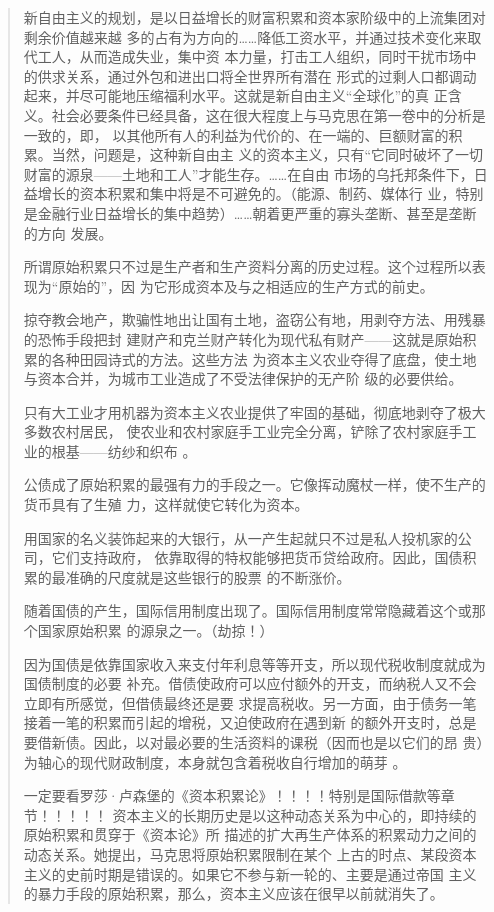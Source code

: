 \begin{quotation}
新自由主义的规划，是以日益增长的财富积累和资本家阶级中的上流集团对剩余价值越来越
多的占有为方向的……降低工资水平，并通过技术变化来取代工人，从而造成失业，集中资
本力量，打击工人组织，同时干扰市场中的供求关系，通过外包和进出口将全世界所有潜在
形式的过剩人口都调动起来，并尽可能地压缩福利水平。这就是新自由主义“全球化”的真
正含义。社会必要条件已经具备，这在很大程度上与马克思在第一卷中的分析是一致的，即，
以其他所有人的利益为代价的、在一端的、巨额财富的积累。当然，问题是，这种新自由主
义的资本主义，只有“它同时破坏了一切财富的源泉——土地和工人”才能生存。……在自由
市场的乌托邦条件下，日益增长的资本积累和集中将是不可避免的。（能源、制药、媒体行
业，特别是金融行业日益增长的集中趋势）……朝着更严重的寡头垄断、甚至是垄断的方向
发展。 




所谓原始积累只不过是生产者和生产资料分离的历史过程。这个过程所以表现为“原始的”，因
为它形成资本及与之相适应的生产方式的前史。

掠夺教会地产，欺骗性地出让国有土地，盗窃公有地，用剥夺方法、用残暴的恐怖手段把封
建财产和克兰财产转化为现代私有财产——这就是原始积累的各种田园诗式的方法。这些方法
为资本主义农业夺得了底盘，使土地与资本合并，为城市工业造成了不受法律保护的无产阶
级的必要供给。

只有大工业才用机器为资本主义农业提供了牢固的基础，彻底地剥夺了极大多数农村居民，
使农业和农村家庭手工业完全分离，铲除了农村家庭手工业的根基——纺纱和织布
。

公债成了原始积累的最强有力的手段之一。它像挥动魔杖一样，使不生产的货币具有了生殖
力，这样就使它转化为资本。

用国家的名义装饰起来的大银行，从一产生起就只不过是私人投机家的公司，它们支持政府，
依靠取得的特权能够把货币贷给政府。因此，国债积累的最准确的尺度就是这些银行的股票
的不断涨价。

随着国债的产生，国际信用制度出现了。国际信用制度常常隐藏着这个或那个国家原始积累
的源泉之一。（劫掠！）

因为国债是依靠国家收入来支付年利息等等开支，所以现代税收制度就成为国债制度的必要
补充。借债使政府可以应付额外的开支，而纳税人又不会立即有所感觉，但借债最终还是要
求提高税收。另一方面，由于债务一笔接着一笔的积累而引起的增税，又迫使政府在遇到新
的额外开支时，总是要借新债。因此，以对最必要的生活资料的课税（因而也是以它们的昂
贵）为轴心的现代财政制度，本身就包含着税收自行增加的萌芽
。

一定要看罗莎·卢森堡的《资本积累论》！！！！特别是国际借款等章节！！！！！
资本主义的长期历史是以这种动态关系为中心的，即持续的原始积累和贯穿于《资本论》所
描述的扩大再生产体系的积累动力之间的动态关系。她提出，马克思将原始积累限制在某个
上古的时点、某段资本主义的史前时期是错误的。如果它不参与新一轮的、主要是通过帝国
主义的暴力手段的原始积累，那么，资本主义应该在很早以前就消失了。


\end{quotation}
